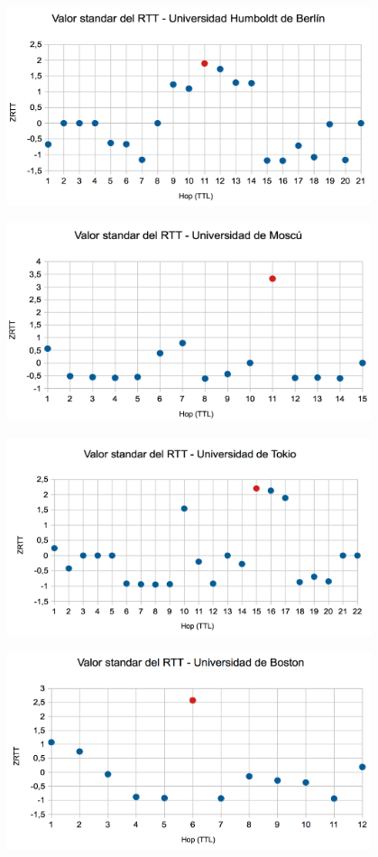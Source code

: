 \centerline{\includegraphics[width=0.8\textwidth]{imagenes/1ra_parte/Alemania_3ergrafico.png}}

\centerline{\includegraphics[width=0.8\textwidth]{imagenes/1ra_parte/Rusia_3ergrafico.png}}

\centerline{\includegraphics[width=0.8\textwidth]{imagenes/1ra_parte/Japon_3ergrafico.png}}

\centerline{\includegraphics[width=0.8\textwidth]{imagenes/1ra_parte/EEUU_3ergrafico.png}}

